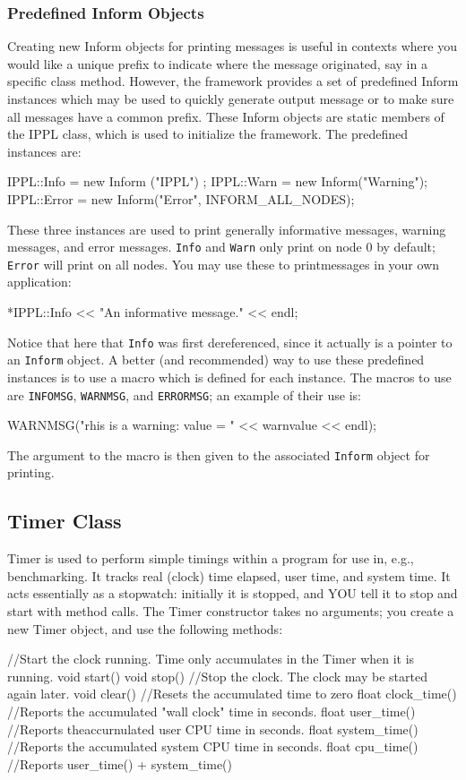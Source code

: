 \subsubsection{Predefined Inform Objects}
Creating new Inform objects for printing messages is useful in contexts where you would like a unique prefix to indicate where the message originated, say in a specific class method. However, the \ippl framework provides a set of predefined Inform instances which may be used to quickly generate output message or to make sure all messages have a common prefix. These Inform objects are static members of the IPPL class, which is used to initialize the framework. The predefined instances are:
\begin{smallcode}
IPPL::Info = new Inform ("IPPL") ; 
IPPL::Warn = new Inform("Warning"); 
IPPL::Error = new Inform("Error", INFORM_ALL_NODES);
\end{smallcode}
These three instances are used to print generally informative messages, warning messages, and error messages. \texttt{Info} and \texttt{Warn} only print on node 0 by default; \texttt{Error} will print on all nodes. You may use these to printmessages in your own application:
\begin{smallcode}
*IPPL::Info << "An informative message." << endl; 
\end{smallcode}
Notice that here that \texttt{Info} was first dereferenced, since it actually is a pointer to an \texttt{Inform} object. A better (and recommended) way to use these predefined instances is to use a macro which is defined for each instance. The macros to use are \texttt{INFOMSG}, \texttt{WARNMSG}, and \texttt{ERRORMSG}; an example of their use is:
\begin{smallcode}
WARNMSG("rhis is a warning: value = " << warnvalue << endl); 
\end{smallcode}
The argument to the macro is then given to the associated \texttt{Inform} object for printing. 

\subsection{Timer Class}
Timer is used to perform simple timings within a program for use in, e.g., benchmarking. It tracks real (clock) time elapsed, user time, and system time. It acts essentially as a stopwatch: 
initially it is stopped, and YOU tell it to stop and start with method calls. The Timer constructor takes no arguments; you create a new Timer object, and use the following methods:
\begin{smallcode}
//Start the clock running. Time only accumulates in the Timer when it is running. 
void start()
void stop()         //Stop the clock. The clock may be started again later. 
void clear()        //Resets the accumulated time to zero
float clock_time()  //Reports the accumulated "wall clock" time in seconds. 
float user_time()   //Reports theaccurnulated user CPU time in seconds. 
float system_time() //Reports the accumulated system CPU time in seconds. 
float cpu_time()    //Reports user_time() + system_time() 
\end{smallcode}

